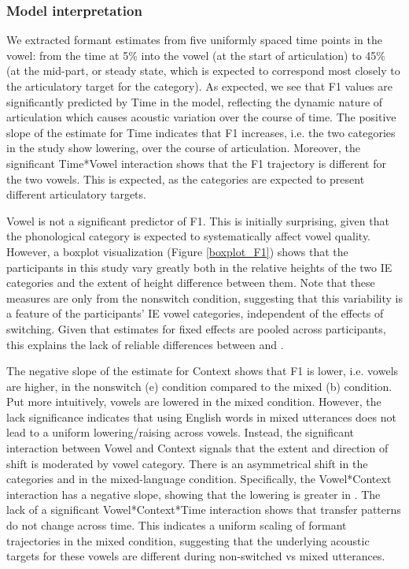 \documentclass[12 pt]{article}
\newcommand{\nt}[1]{\textipa{[#1]}} %
\begin{document}
\subsubsection*{Model interpretation}
We extracted formant estimates from five uniformly spaced time points in the vowel: from the time at 5\% into the vowel (at the start of articulation) to 45\% (at the mid-part, or steady state, which is expected to correspond most closely to the articulatory target for the category). As expected, we see that F1 values are significantly predicted by Time in the model, reflecting the dynamic nature of articulation which causes acoustic variation over the course of time. The positive slope of the estimate for Time indicates that F1 increases, i.e. the two categories in the study show lowering, over the course of articulation. Moreover, the significant Time*Vowel interaction shows that the F1 trajectory is different for the two vowels. This is expected, as the categories are expected to present different articulatory targets.  

Vowel is not a significant predictor of F1. This is initially surprising, given that the phonological category is expected to systematically affect vowel quality. However, a boxplot visualization (Figure \ref{boxplot_F1}) shows that the participants in this study vary greatly both in the relative heights of the two IE categories \nt{2, \ae} and the extent of height difference between them. Note that these measures are only from the nonswitch condition, suggesting that this variability is a feature of the participants' IE vowel categories, independent of the effects of switching. Given that estimates for fixed effects are pooled across participants, this explains the lack of reliable differences between \nt{2} and \nt{\ae}. 
 
The negative slope of the estimate for Context shows that F1 is lower, i.e. vowels are higher, in the nonswitch (e) condition compared to the mixed (b) condition. Put more intuitively, vowels are lowered in the mixed condition. However, the lack significance indicates that using English words in mixed utterances does not lead to a uniform lowering/raising across vowels. Instead, the significant interaction between Vowel and Context signals that the extent and direction of shift is moderated by vowel category. There is an asymmetrical shift in the categories \nt{2} and \nt{\ae} in the mixed-language condition. Specifically, the Vowel*Context interaction has a negative slope, showing that the lowering is greater in \nt{2}. The lack of a significant Vowel*Context*Time interaction shows that transfer patterns do not change across time. This indicates a uniform scaling of formant trajectories in the mixed condition, suggesting that the underlying acoustic targets for these vowels are different during non-switched vs mixed utterances. 
 
\end{document}
